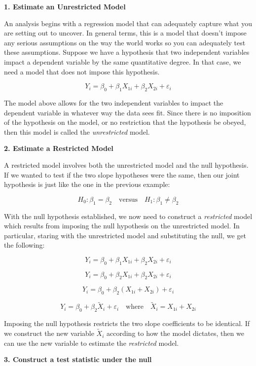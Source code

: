 \documentclass[
]{book}
\begin{document}
\textbf{1. Estimate an Unrestricted Model}

An analysis begins with a regression model that can adequately capture what you are setting out to uncover. In general terms, this is a model that doesn't impose any serious assumptions on the way the world works so you can adequately test these assumptions. Suppose we have a hypothesis that two independent variables impact a dependent variable by the same quantitative degree. In that case, we need a model that does not impose this hypothesis.

\[Y_i = \beta_0 + \beta_1 X_{1i} + \beta_2 X_{2i} + \varepsilon_i\]

The model above allows for the two independent variables to impact the dependent variable in whatever way the data sees fit. Since there is no imposition of the hypothesis on the model, or no restriction that the hypothesis be obeyed, then this model is called the \emph{unrestricted} model.

\textbf{2. Estimate a Restricted Model}

A restricted model involves both the unrestricted model and the null hypothesis. If we wanted to test if the two slope hypotheses were the same, then our joint hypothesis is just like the one in the previous example:

\[H_0:\beta_1=\beta_2 \quad \text{versus} \quad H_1:\beta_1 \neq \beta_2\]

With the null hypothesis established, we now need to construct a \emph{restricted} model which results from imposing the null hypothesis on the unrestricted model. In particular, staring with the unrestricted model and substituting the null, we get the following:

\[Y_i = \beta_0 + \beta_1 X_{1i} + \beta_2 X_{2i} + \varepsilon_i\]

\[Y_i = \beta_0 + \beta_2 X_{1i} + \beta_2 X_{2i} + \varepsilon_i\]

\[Y_i = \beta_0 + \beta_2 (X_{1i} + X_{2i}) + \varepsilon_i\]

\[Y_i = \beta_0 + \beta_2 \tilde{X}_{i} + \varepsilon_i \quad \text{where} \quad \tilde{X}_{i} = X_{1i} + X_{2i}\]

Imposing the null hypothesis restricts the two slope coefficients to be identical. If we construct the new variable \(\tilde{X}_i\) according to how the model dictates, then we can use the new variable to estimate the \emph{restricted} model.

\textbf{3. Construct a test statistic under the null}
\end{document}
